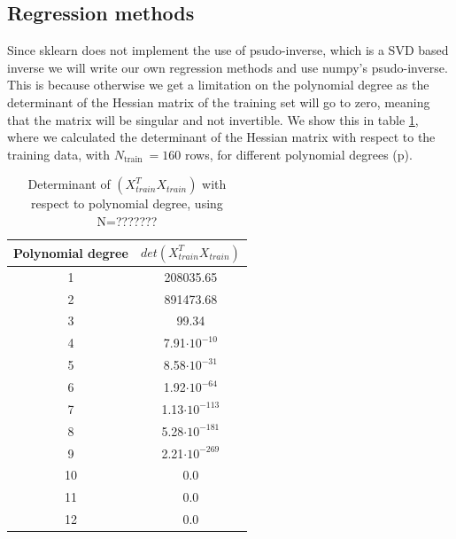   




\subsection{Regression methods} \label{sec:regression_methods}
Since sklearn does not implement the use of psudo-inverse, which is a SVD based
inverse we will write our own regression methods and use numpy's psudo-inverse.
This is because otherwise we get a limitation on the polynomial degree as the
determinant of the Hessian matrix of the training set will go to zero, meaning
that the matrix will be singular and not invertible. We show this in table
\ref{tab:determinants}, where we calculated the determinant of the Hessian matrix with respect to the
training data, with $N_{\text{train }} = 160 $ rows, for different polynomial
degrees (p). 

\begin{table}
    \centering
    \caption{Determinant of $(X^T_{train}X_{train})$ with respect to polynomial
    degree, using N=???????}
    \begin{tabular}{|c|c|}
        \hline
        Polynomial degree & $det(X_{train}^T X_{train})$  \\
        \hline
        1 & 208035.65\\
        \hline
        2 & 891473.68\\
        \hline
        3 & 99.34\\
        \hline
        4 & 7.91$\cdot10^{-10}$ \\
        \hline
        5 & 8.58$\cdot10^{-31}$ \\
        \hline
        6 & 1.92$\cdot10^{-64}$ \\
        \hline
        7 & 1.13$\cdot10^{-113}$ \\
        \hline
        8 & 5.28$\cdot10^{-181}$ \\
        \hline
        9 & 2.21$\cdot10^{-269}$ \\
        \hline
        10 & 0.0 \\
        \hline
        11 & 0.0 \\
        \hline
        12 & 0.0 \\
        \hline
    \end{tabular}\label{tab:determinants}
\end{table}


